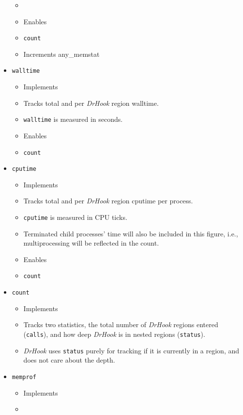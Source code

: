\begin{itemize}
\begin{itemize}
        \item {}
        \item[] Enables
        \item \verb+count+
        \item Increments any\_memstat
    \end{itemize}
    \item\verb+walltime+
    \begin{itemize}
        \item[] Implements
        \item Tracks total and per \textit{DrHook} region walltime.
        \item \texttt{walltime} is measured in seconds.
        \item[] Enables
        \item \verb+count+
    \end{itemize}
    \item\verb+cputime+
    \begin{itemize}
        \item[] Implements
        \item Tracks total and per \textit{DrHook} region cputime per process.
        \item \texttt{cputime} is measured in CPU ticks.
        \item Terminated child processes' time will also be included in this figure, i.e., multiprocessing will be reflected in the count.
        \item[] Enables\item \verb+count+
    \end{itemize}
    \item\verb+count+
    \begin{itemize}
        \item[] Implements
        \item Tracks two statistics, the total number of \textit{DrHook} regions entered (\texttt{calls}), and how deep \textit{DrHook} is in nested regions (\texttt{status}).
        \item \textit{DrHook} uses \texttt{status} purely for tracking if it is currently in a region, and does not care about the depth.
    \end{itemize}
    \item\verb+memprof+
    \begin{itemize}
        \item[] Implements
        \item {}

\end{itemize}
\end{itemize}
